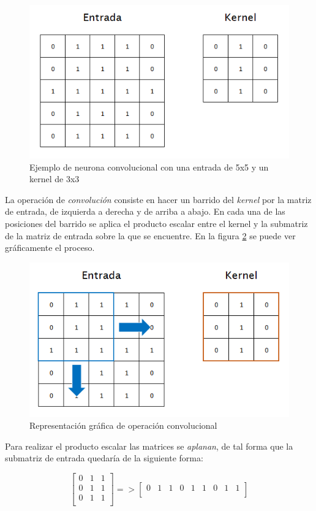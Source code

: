 \begin{figure}[H]
	\centering
	\includegraphics[width=0.7\linewidth]{images/convolutional_neuron_example.png}
	\caption{Ejemplo de neurona convolucional con una entrada de 5x5 y un kernel de 3x3}
	\label{fig:cnn_neuronex}
\end{figure}

La operación de \textit{convolución} consiste en hacer un barrido del \textit{kernel} por la matriz de entrada, de izquierda a derecha y de arriba a abajo. En cada una de las posiciones del barrido se aplica el producto escalar entre el kernel y la submatriz de la matriz de entrada sobre la que se encuentre. En la figura \ref{fig:cnn_convolutionoperationex} se puede ver gráficamente el proceso.

\begin{figure}[H]
	\centering
	\includegraphics[width=0.7\linewidth]{images/convolutional_operation_example.png}
	\caption{Representación gráfica de operación convolucional}
	\label{fig:cnn_convolutionoperationex}
\end{figure}

Para realizar el producto escalar las matrices se \textit{aplanan}, de tal forma que la submatriz de entrada quedaría de la siguiente forma:

\begin{equation}
	\left[
	\begin{array}{ccc}
		0 & 1 & 1 \\
		0 & 1 & 1 \\
		0 & 1 & 1 \\
	\end{array}
	\right]
	=>
	\left[
	\begin{array}{ccccccccc}
		0 & 1 & 1 & 0 & 1 & 1 & 0 & 1 & 1 \\
	\end{array}
	\right]
	\nonumber
\end{equation}


